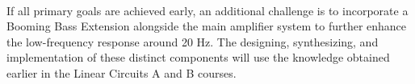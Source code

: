 \paragraph{}
If all primary goals are achieved early, an additional challenge is to incorporate a Booming Bass Extension alongside the main amplifier system to further enhance the low-frequency response around 20 Hz. The designing, synthesizing, and implementation of these distinct components will use the knowledge obtained earlier in the Linear Circuits A and B courses.



